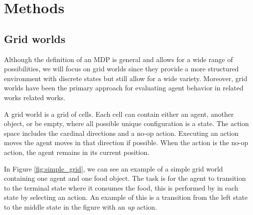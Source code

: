 \documentclass[12pt,A4]{report}
\newcommand{\autobaj}{}
\theoremstyle{definition}
\begin{document}

\chapter{Methods}


\section{Grid worlds}
Although the definition of an MDP is general and allows for a wide range of possibilities, we will focus on grid worlds since they provide a more structured environment with discrete states but still allow for a wide variety. Moreover, grid worlds have been the primary approach for evaluating agent behavior in related works \autobaj{related works}.

A grid world is a grid of cells. Each cell can contain either an agent, another object, or be empty, where all possible unique configuration is a state. The action space includes the cardinal directions and a no-op action. Executing an action moves the agent moves in that direction if possible. When the action is the no-op action, the agent remains in its current position. 

In Figure \ref{fig:simple_grid}, we can see an example of a simple grid world containing one agent and one food object. The task is for the agent to transition to the terminal state where it consumes the food, this is performed by in each state by selecting an action. An example of this is a transition from the left state to the middle state in the figure with an \textit{up} action. 
\end{document}
